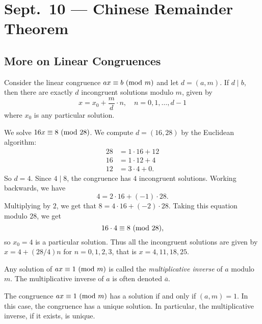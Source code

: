 \chapter{Sept.~10 --- Chinese Remainder Theorem}

\section{More on Linear Congruences}

\begin{corollary}
  Consider the linear congruence
  $ax \equiv b \ (\mathrm{mod}\ m)$ and let
  $d = (a, m)$. If $d \mid b$, then
  there are exactly $d$ incongruent
  solutions modulo $m$, given by
  \[
    x = x_0 + \frac{m}{d} \cdot n,
    \quad n = 0, 1, \dots, d - 1
  \]
  where $x_0$ is any particular solution.
\end{corollary}

\begin{example}
  We solve $16 x \equiv 8 \ (\mathrm{mod}\ 28)$. We
  compute
  $d = (16, 28)$ by the Euclidean algorithm:
  \begin{align*}
    28 &= 1 \cdot 16 + 12 \\
    16 &= 1 \cdot 12 + 4 \\
    12 &= 3 \cdot 4 + 0.
  \end{align*}
  So $d = 4$. Since $4 \mid 8$, the
  congruence has $4$ incongruent solutions.
  Working backwards, we have
  \[
    4 = 2 \cdot 16 + (-1) \cdot 28.
  \]
  Multiplying by $2$, we get that
  $8 = 4 \cdot 16 + (-2) \cdot 28$.
  Taking this equation modulo $28$, we get
  \[
    16 \cdot 4 \equiv 8 \ (\mathrm{mod}\ 28),
  \]
  so $x_0 = 4$ is a particular solution.
  Thus all the incongruent solutions
  are given by
  $x = 4 + (28 / 4) n$ for
  $n = 0, 1, 2, 3$, that is
  $x = 4, 11, 18, 25$.
\end{example}

\begin{definition}
  Any solution of $ax \equiv 1 \ (\mathrm{mod}\ m)$
  is called the \emph{multiplicative inverse}
  of $a$ modulo $m$. The multiplicative
  inverse of $a$ is often denoted
  $\overline{a}$.
\end{definition}

\begin{corollary}
  The congruence $ax \equiv 1 \ (\mathrm{mod}\ m)$
  has a solution if and only if
  $(a, m) = 1$. In this case, the
  congruence has a unique solution.
  In particular, the multiplicative
  inverse, if it exists, is unique.
\end{corollary}

